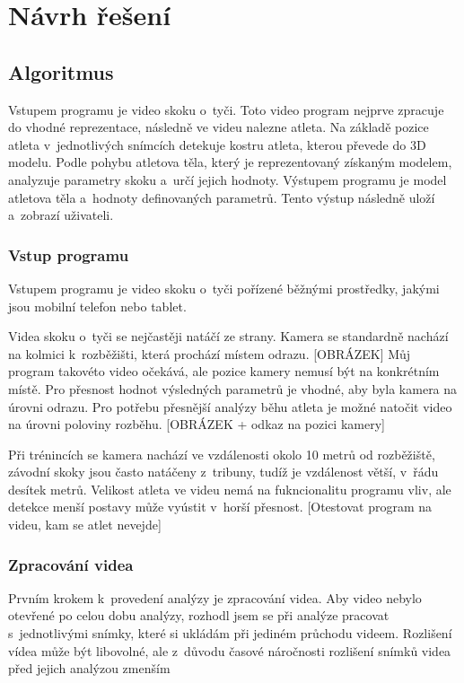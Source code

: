 \chapter{Návrh řešení}

\section{Algoritmus}

Vstupem programu je video skoku o~tyči. Toto video program nejprve zpracuje do vhodné reprezentace, následně ve videu nalezne atleta. Na základě pozice atleta v~jednotlivých snímcích detekuje kostru atleta, kterou převede do 3D modelu. Podle pohybu atletova těla, který je reprezentovaný získaným modelem, analyzuje parametry skoku a~určí jejich hodnoty. Výstupem programu je model atletova těla a~hodnoty definovaných parametrů. Tento výstup následně uloží a~zobrazí uživateli.

\subsection{Vstup programu}

Vstupem programu je video skoku o~tyči pořízené běžnými prostředky, jakými jsou mobilní telefon nebo tablet.

Videa skoku o~tyči se nejčastěji natáčí ze strany. Kamera se standardně nachází na kolmici k~rozběžišti, která prochází místem odrazu. [OBRÁZEK] Můj program takovéto video očekává, ale pozice kamery nemusí být na konkrétním místě. Pro přesnost hodnot výsledných parametrů je vhodné, aby byla kamera na úrovni odrazu. Pro potřebu přesnější analýzy běhu atleta je možné natočit video na úrovni poloviny rozběhu. [OBRÁZEK + odkaz na pozici kamery]

Při trénincích se kamera nachází ve vzdálenosti okolo 10 metrů od rozběžiště, závodní skoky jsou často natáčeny z~tribuny, tudíž je vzdálenost větší, v~řádu desítek metrů. Velikost atleta ve videu nemá na fukncionalitu programu vliv, ale detekce menší postavy může vyústit v~horší přesnost. [Otestovat program na videu, kam se atlet nevejde]

\subsection{Zpracování videa}

Prvním krokem k~provedení analýzy je zpracování videa. Aby video nebylo otevřené po celou dobu analýzy, rozhodl jsem se při analýze pracovat s~jednotlivými snímky, které si ukládám při jediném průchodu videem. Rozlišení vídea může být libovolné, ale z~důvodu časové náročnosti rozlišení snímků videa před jejich analýzou zmenším

